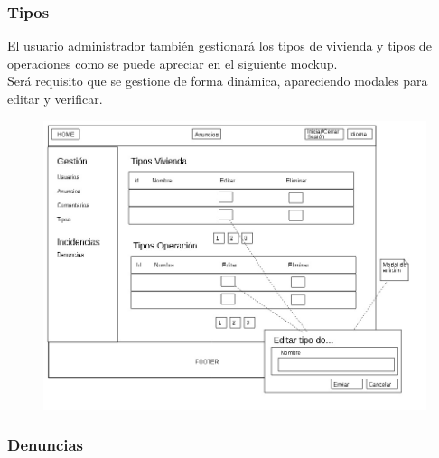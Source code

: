 \subsubsection{Tipos}
El usuario administrador tambi\'{e}n gestionar\'{a} los tipos de vivienda y tipos de operaciones como se puede apreciar en el siguiente mockup.\\

Ser\'{a} requisito que se gestione de forma din\'{a}mica, apareciendo modales para editar y verificar. 

\begin{figure}[h!]
\centering
\includegraphics[width=8\textwidth]{Img/VisionAplicacion/vision_12.jpg}
\end{figure}

\subsubsection{Denuncias}

